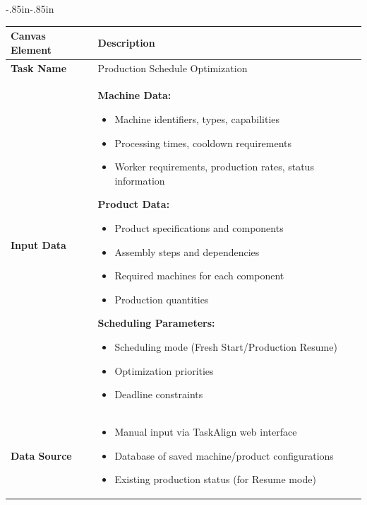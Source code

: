 \begin{table}[H]
    \begin{adjustwidth}{-.85in}{-.85in}
    \noindent
    \centering
    \label{tab:ai_canvas}
    \footnotesize
    \begin{tabularx}{1.3\textwidth}{|l|X|}
        \hline
        \textbf{Canvas Element} & \textbf{Description} \\
        \hline
        \textbf{Task Name} & Production Schedule Optimization \\
        \hline
        \textbf{Input Data} &
        \textbf{Machine Data:}
        \begin{itemize}[nosep,leftmargin=*,topsep=2pt, partopsep=0pt, itemsep=1pt]
            \item Machine identifiers, types, capabilities
            \item Processing times, cooldown requirements
            \item Worker requirements, production rates, status information
        \end{itemize}
        \textbf{Product Data:}
        \begin{itemize}[nosep,leftmargin=*,topsep=2pt, partopsep=0pt, itemsep=1pt]
            \item Product specifications and components
            \item Assembly steps and dependencies
            \item Required machines for each component
            \item Production quantities
        \end{itemize}
        \textbf{Scheduling Parameters:}
        \begin{itemize}[nosep,leftmargin=*,topsep=2pt, partopsep=0pt, itemsep=1pt]
            \item Scheduling mode (Fresh Start/Production Resume)
            \item Optimization priorities
            \item Deadline constraints
        \end{itemize} \\
        \hline
        \textbf{Data Source} &
        \begin{itemize}[nosep,leftmargin=*,topsep=2pt, partopsep=0pt, itemsep=1pt]
            \item Manual input via TaskAlign web interface
            \item Database of saved machine/product configurations
            \item Existing production status (for Resume mode)

\end{itemize}
\end{tabularx}
\end{adjustwidth}
\end{table}
